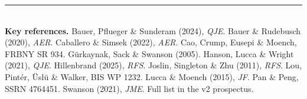 \documentclass[11pt]{article}
\begin{document}
\enlargethispage{3\baselineskip}
\vspace{0.35em}
\noindent\rule{\textwidth}{0.4pt}\\[0.2em]
\scriptsize\textbf{Key references.} Bauer, Pflueger \& Sunderam (2024), \emph{QJE}. Bauer \&
Rudebusch (2020), \emph{AER}. Caballero \& Simsek (2022), \emph{AER}. Cao, Crump, Eusepi \&
Moench, FRBNY SR 934. Gürkaynak, Sack \& Swanson (2005). Hanson, Lucca \& Wright (2021),
\emph{QJE}. Hillenbrand (2025), \emph{RFS}. Joslin, Singleton \& Zhu (2011), \emph{RFS}. Lou,
Pintér, Üslü \& Walker, BIS WP 1232. Lucca \& Moench (2015), \emph{JF}. Pan \& Peng, SSRN
4764451. Swanson (2021), \emph{JME}. Full list in the v2 prospectus.
\end{document}
